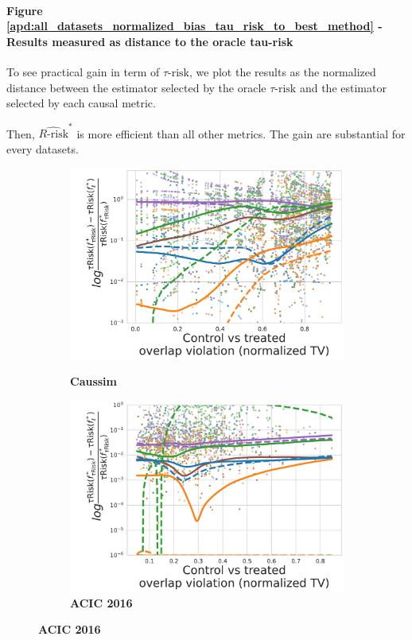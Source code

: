 \documentclass[a4paper,num-refs]{oup-contemporary}%
\begin{document}
\paragraph{Figure \ref{apd:all_datasets_normalized_bias_tau_risk_to_best_method}
    - Results measured as distance to the oracle tau-risk}

To see practical gain in term of $\tau\text{-risk}$, we plot the results as the
normalized distance between the estimator selected by the oracle
$\tau\text{-risk}$ and the estimator selected by each causal metric.

Then, $\widehat{R\text{-risk}}^*$ is more efficient than all other metrics. The
gain are substantial for every datasets.

\begin{figure}
    \centering
    \begin{subfigure}[b]{0.44\textwidth}
        \centering
        \caption{\textbf{Caussim}}
        \includegraphics[width=\textwidth]{norm_bias_trisk_tobest_caussim_nuis_nlin_models_ridge.pdf}
        \label{fig:normalized_bias_tau_risk_to_best_method_caussim}
    \end{subfigure}
    \hfill
    \begin{subfigure}[b]{0.44\textwidth}
        \centering
        \caption{\textbf{ACIC 2016}}
        \includegraphics[width=\textwidth]{norm_bias_trisk_tobest_acic2016_nuis_nlin_models_hgb.pdf}

\end{subfigure}
\end{figure}
\end{document}
